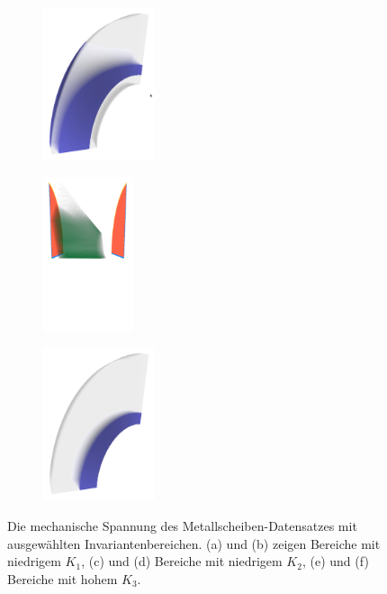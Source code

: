 \documentclass[a4paper,fontsize=12pt,toc=bib,halfparskip]{scrartcl}
\begin{document}
\begin{figure}
\begin{subfigure}{0.49\textwidth}
		\subcaption{}
		\label{MetalDiskStressInvariant2}
	\end{subfigure}
	\hspace*{\fill}
	\begin{subfigure}{0.49\textwidth}
		\centering
		\includegraphics[height=4.5cm]{pictures/results/MetalDiskStress_Object2.png}
		\subcaption{}
		\label{MetalDiskStressObject2}
	\end{subfigure}
	\medskip
	\begin{subfigure}{0.49\textwidth}
		\centering
		\includegraphics[height=4.5cm]{pictures/results/MetalDiskStress_InvariantSpace3.png}
		\subcaption{}
		\label{MetalDiskStressInvariant3}
	\end{subfigure}
	\hspace*{\fill}
	\begin{subfigure}{0.49\textwidth}
		\centering
		\includegraphics[height=4.5cm]{pictures/results/MetalDiskStress_Object3.png}
		\subcaption{}
		\label{MetalDiskStressObject3}
	\end{subfigure}
	\caption{Die mechanische Spannung des Metallscheiben-Datensatzes mit ausgew\"ahlten Invariantenbereichen. (a) und (b) zeigen Bereiche mit niedrigem $K_1$, (c) und (d) Bereiche mit niedrigem $K_2$, (e) und (f) Bereiche mit hohem $K_3$.}
	\label{MetalDiskStressInteraction}
\end{figure}
\end{document}
